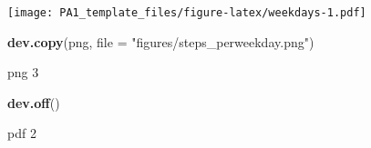 \documentclass[
]{article}
\newenvironment{Shaded}{\begin{snugshade}}{\end{snugshade}}
\newcommand{\DataTypeTok}[1]{\textcolor[rgb]{0.13,0.29,0.53}{#1}}
\newcommand{\KeywordTok}[1]{\textcolor[rgb]{0.13,0.29,0.53}{\textbf{#1}}}
\newcommand{\NormalTok}[1]{#1}
\newcommand{\StringTok}[1]{\textcolor[rgb]{0.31,0.60,0.02}{#1}}
\begin{document}
\texttt{[image: PA1\_template\_files/figure-latex/weekdays-1.pdf]}

\begin{Shaded}
\begin{Highlighting}[]
\KeywordTok{dev.copy}\NormalTok{(png, }\DataTypeTok{file =} \StringTok{"figures/steps_perweekday.png"}\NormalTok{)}
\end{Highlighting}
\end{Shaded}

png 3

\begin{Shaded}
\begin{Highlighting}[]
\KeywordTok{dev.off}\NormalTok{()}
\end{Highlighting}
\end{Shaded}

pdf 2
\end{document}
